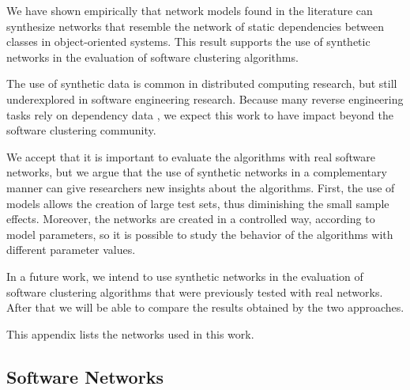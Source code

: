 We have shown empirically that network models found in the literature can
synthesize networks that resemble the network of static dependencies between
classes in object-oriented systems. This result supports the use of synthetic
networks in the evaluation of software clustering algorithms.

The use of synthetic data is common in distributed computing research, but still
underexplored in software engineering research. Because many reverse engineering
tasks rely on dependency data \cite{Tonella2007}, we expect this work to have
impact beyond the software clustering community.


We accept that it is important to evaluate the algorithms with real software
networks, but we argue that the use of synthetic networks in a complementary
manner can give researchers new insights about the algorithms. First, the use of
models allows the creation of large test sets, thus diminishing the small sample
effects. Moreover, the networks are created in a controlled way, according to
model parameters, so it is possible to study the behavior of the algorithms with
different parameter values.

In a future work, we intend to use synthetic networks in the evaluation of
software clustering algorithms that were previously tested with real networks.
After that we will be able to compare the results obtained by the two
approaches.

\appendix %

This appendix lists the networks used in this work.

\subsection{Software Networks}

